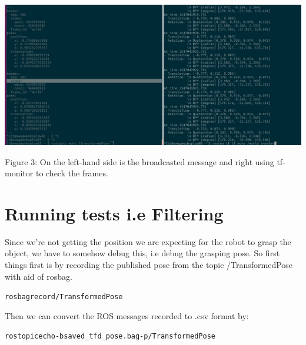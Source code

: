 \documentclass{article}
\begin{document}
\begin{center}
  \includegraphics[scale=0.3]{pictures/pic3.jpeg}

  Figure 3:  On the left-hand side is the broadcasted message and right using tf-monitor to check the frames.
\end{center}

\section{Running tests i.e Filtering}
Since we're not getting the position we are expecting for the robot to grasp the object, we have to somehow debug this, i.e debug the grasping pose. So first things first is by recording the published pose from the topic /TransformedPose with aid of rosbag.
\begin{alltt}
    rosbag record /TransformedPose
\end{alltt}
Then we can convert the ROS messages recorded to .csv format by:
\begin{alltt}
    rostopic echo -b saved_tfd_pose.bag -p /TransformedPose
\end{alltt}
\end{document}
